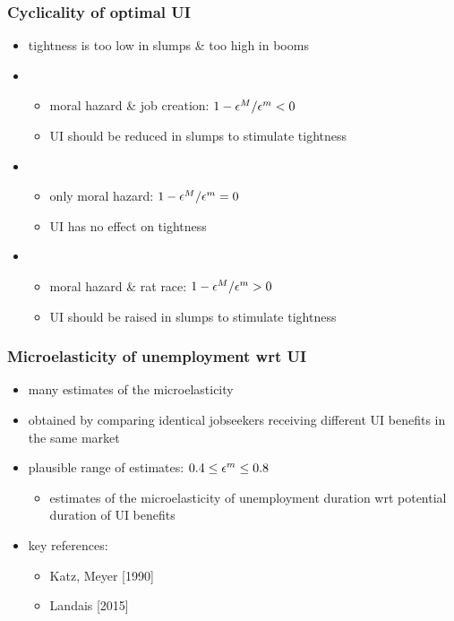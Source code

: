 \documentclass[12pt,xcolor={dvipsnames},hyperref={pdftex,pdfpagemode=UseNone,hidelinks,pdfdisplaydoctitle=true},usepdftitle=false]{beamer}
\begin{document}
\begin{frame}
\frametitle{Cyclicality of optimal UI}
\begin{itemize}
\item tightness is too low in slumps \& too high in booms
\item {}
\begin{itemize}
\item moral hazard \& job creation: $1-\epsilon^{M}/\epsilon^{m}<0$
\item UI should be reduced in slumps to stimulate tightness
\end{itemize}
\item {}
\begin{itemize}
\item only moral hazard: $1-\epsilon^{M}/\epsilon^{m}=0$
\item UI has no effect on tightness
\end{itemize}
\item {}
\begin{itemize}
\item moral hazard \& rat race: $1-\epsilon^{M}/\epsilon^{m}>0$
\item UI should be raised in slumps to stimulate tightness
\end{itemize}
\end{itemize}
\end{frame}

\begin{frame}
\end{frame}


\begin{frame}
\frametitle{Microelasticity of unemployment wrt UI}
\begin{itemize}
\item many estimates of the microelasticity
\item obtained by comparing identical jobseekers receiving different UI benefits in the same market
\item plausible range of estimates: $0.4 \leq \epsilon^m \leq 0.8$
\begin{itemize}
\item estimates of the microelasticity of unemployment duration wrt potential duration of UI benefits
\end{itemize}
\item key references:
\begin{itemize}
\item Katz, Meyer [1990]
\item Landais [2015]
\end{itemize}
\end{itemize}
\end{frame}
\end{document}

